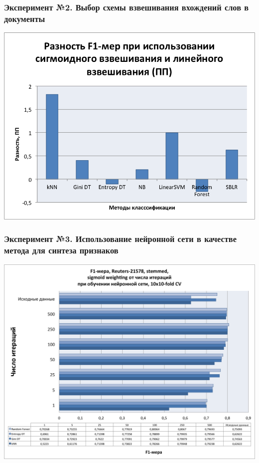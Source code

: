\documentclass{beamer}
\begin{document}
\begin{frame}
\frametitle{Эксперимент №2. Выбор схемы взвешивания вхождений слов в документы}
\begin{center}
    \includegraphics[width=\linewidth,height=0.7\textheight,align=\center,trim=4 4 4 4, clip, keepaspectratio]{lin-sigm-diff.png}
\end{center}
\end{frame}

\begin{frame}
\frametitle{Эксперимент №3. Использование нейронной сети в качестве метода для синтеза признаков}
\begin{center}
    \includegraphics[width=\linewidth,height=0.8\textheight,align=\center,trim=4 4 4 4, clip, keepaspectratio]{neural-reuters.png}
\end{center}
\end{frame}
\end{document}
